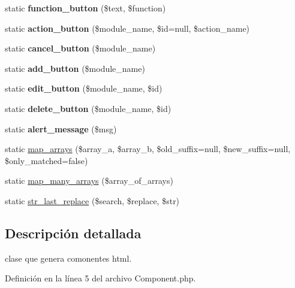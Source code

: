 \begin{DoxyCompactItemize}
static {\bfseries function\+\_\+button} (\$text, \$function)
\item 
\mbox{\label{class_component_a86649b27c4e2418877d523f60460e9b9}} 
static {\bfseries action\+\_\+button} (\$module\+\_\+name, \$id=null, \$action\+\_\+name)
\item 
\mbox{\label{class_component_ad36eae0f372fbb421d87eee76bc6209a}} 
static {\bfseries cancel\+\_\+button} (\$module\+\_\+name)
\item 
\mbox{\label{class_component_ae10dcbce31b4ec1f520bd65a2c7cbcf6}} 
static {\bfseries add\+\_\+button} (\$module\+\_\+name)
\item 
\mbox{\label{class_component_acfded6240653626b9230402edda32dcb}} 
static {\bfseries edit\+\_\+button} (\$module\+\_\+name, \$id)
\item 
\mbox{\label{class_component_ad4be83d924fdeec6c86255748315fde2}} 
static {\bfseries delete\+\_\+button} (\$module\+\_\+name, \$id)
\item 
\mbox{\label{class_component_ab06d73bf19257f1ced9a74f318720cd1}} 
static {\bfseries alert\+\_\+message} (\$msg)
\item 
static \mbox{\hyperlink{class_component_af653678b68f3c0a105ee403a242c2958}{map\+\_\+arrays}} (\$array\+\_\+a, \$array\+\_\+b, \$old\+\_\+suffix=null, \$new\+\_\+suffix=null, \$only\+\_\+matched=false)
\item 
static \mbox{\hyperlink{class_component_ab24893f7efe63552c37b7d35104f53c7}{map\+\_\+many\+\_\+arrays}} (\$array\+\_\+of\+\_\+arrays)
\item 
static \mbox{\hyperlink{class_component_a1fecda46a9e46fdcf102ab6cffb262aa}{str\+\_\+last\+\_\+replace}} (\$search, \$replace, \$str)
\end{DoxyCompactItemize}


\subsection{Descripción detallada}
clase que genera comonentes html. 

Definición en la línea 5 del archivo Component.\+php.



